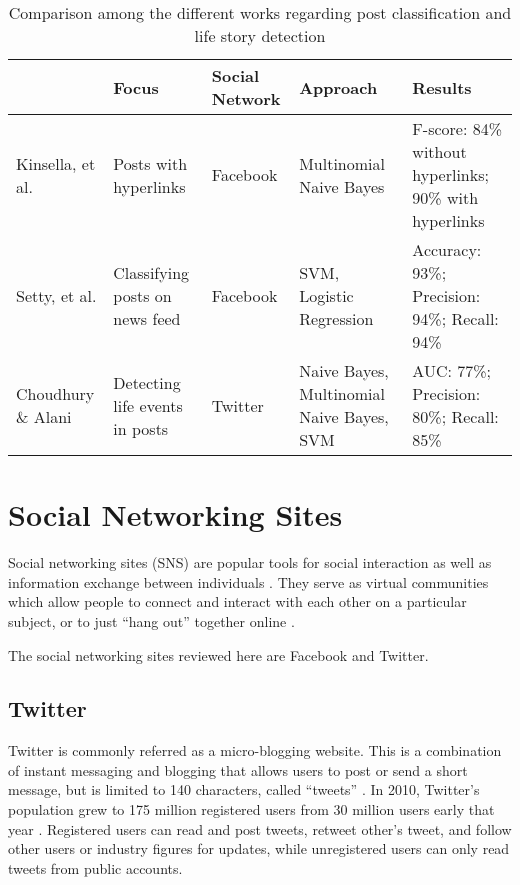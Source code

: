 \clearpage
\begin{sidewaystable}[ph!]   %
	\centering
	\caption{Comparison among the different works regarding post classification and life story detection} \vspace{0.25em}
	\begin{tabular}{|p{1.5in}|p{1.5in}|p{1.5in}|p{1.5in}|p{1.5in}|} \hline
		\centering  & Focus & Social Network & Approach & Results \\ \hline
		Kinsella, et al. \citeyear{DBLP:conf/ecir/KinsellaPB11} & Posts with hyperlinks & Facebook & Multinomial Naive Bayes & F-score: 84\% without hyperlinks; 90\% with hyperlinks \\ \hline
		Setty, et al. \citeyear{setty2014classification} & Classifying posts on news feed & Facebook & SVM, Logistic Regression & Accuracy: 93\%; Precision: 94\%; Recall: 94\% \\ \hline
		Choudhury \& Alani \citeyear{choudhury2014personal} & Detecting life events in posts & Twitter & Naive Bayes, Multinomial Naive Bayes, SVM & AUC: 77\%; Precision: 80\%; Recall: 85\% \\ \hline
	\end{tabular}
	\label{tab:KnowledgeBase}
\end{sidewaystable}
\clearpage

\section{Social Networking Sites}
Social networking sites (SNS) are popular tools for social interaction as well as information exchange between individuals \cite{HughesRoweBateyLee2012}. They serve as virtual communities which allow people to connect and interact with each other on a  particular subject, or to just ``hang out'' together online \cite{CheungChiuLee2011}.

The social networking sites reviewed here are Facebook and Twitter.

\subsection{Twitter}
Twitter is commonly referred as a micro-blogging website. This is a combination of instant messaging and blogging that allows users to post or send a short message, but is limited to 140 characters, called ``tweets'' \cite{Crymble2010}. In 2010, Twitter's population grew to 175 million registered users from 30 million users early that year \cite{Rao2010}. Registered users can read and post tweets, retweet other's tweet, and follow other users or industry figures for updates, while unregistered users can only read tweets from public accounts.

